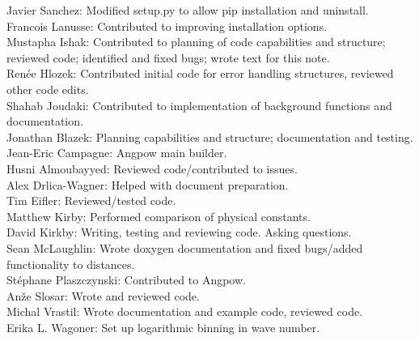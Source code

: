Javier Sanchez: Modified setup.py to allow pip installation and uninstall. \\
Francois Lanusse: Contributed to improving installation options. \\
Mustapha Ishak: Contributed to planning of code capabilities and structure; reviewed code; identified and fixed bugs; wrote text for this note. \\
Ren\'ee Hlozek: Contributed initial code for error handling structures, reviewed other code edits. \\
Shahab Joudaki: Contributed to implementation of background functions and documentation. \\
Jonathan Blazek: Planning capabilities and structure; documentation and testing. \\
Jean-Eric Campagne: Angpow main builder. \\
Husni Almoubayyed: Reviewed code/contributed to issues. \\
Alex Drlica-Wagner: Helped with document preparation. \\
Tim Eifler: Reviewed/tested code. \\
Matthew Kirby: Performed comparison of physical constants. \\
David Kirkby: Writing, testing and reviewing code. Asking questions. \\
Sean McLaughlin: Wrote doxygen documentation and fixed bugs/added functionality to distances. \\
St\'ephane Plaszczynski: Contributed to Angpow. \\
An\v{z}e Slosar: Wrote and reviewed code. \\
Michal Vrastil: Wrote documentation and example code, reviewed code. \\
Erika L. Wagoner: Set up logarithmic binning in wave number. \\

